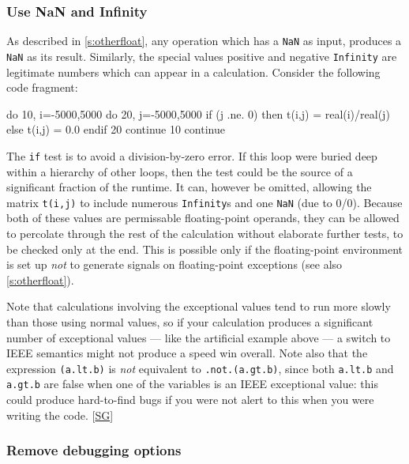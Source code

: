 \documentclass[11pt,oneside,chapters]{starlink}
\begin{document}
\subsubsection{Use NaN and Infinity}
\label{s:optimnan}


As described in \ref{s:otherfloat}, any operation
which has a \texttt{NaN} as input, produces a
\texttt{NaN} as its result.  Similarly, the special
values positive and negative \texttt{Infinity} are
legitimate numbers which can appear in a calculation.
Consider the following code fragment:

\begin{terminalv}
      do 10, i=-5000,5000
         do 20, j=-5000,5000
            if (j .ne. 0) then
               t(i,j) = real(i)/real(j)
            else
               t(i,j) = 0.0
            endif
   20    continue
   10 continue
\end{terminalv}

The \texttt{if} test is to avoid a division-by-zero
error.  If this loop were buried deep within a hierarchy
of other loops, then the test could be the source of a
significant fraction of the runtime.  It can, however be
omitted, allowing the matrix \texttt{t(i,j)} to
include numerous \texttt{Infinity}s and one
\texttt{NaN} (due to 0/0).  Because both of these
values are permissable floating-point operands, they can
be allowed to percolate through the rest of the
calculation without elaborate further tests, to be
checked only at the end.  This is possible only if the
floating-point environment is set up \emph{not} to
generate signals on floating-point exceptions (see also
\ref{s:otherfloat}).

Note that calculations involving the exceptional values
tend to run more slowly than those using normal values,
so if your calculation produces a significant number of
exceptional values --- like the artificial example above
--- a switch to IEEE semantics might not produce a speed
win overall.  Note also that the expression
\texttt{(a.lt.b)} is \emph{not} equivalent to
\texttt{.not.(a.gt.b)}, since both
\texttt{a.lt.b} and
\texttt{a.gt.b} are false
when one of the variables is an IEEE exceptional value:
this could produce hard-to-find bugs if you were not
alert to this when you were writing the code.
[\hyperlink{ta:sg}{SG}]


\subsubsection{Remove debugging options}
\end{document}
